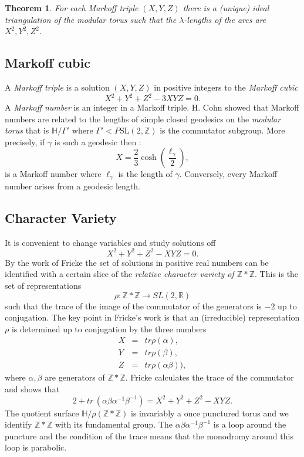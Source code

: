 \documentclass[14pt,a4paper]{amsart}
\newtheorem{thm}{Theorem}[section]
\def\HH{\mathbb{H}}
\def\ZZ{\mathbb{Z}}
\def\RR{\mathbb{R}}
\def\sl2{\mathrm{SL}(2, \ZZ)}
\begin{document}
 \begin{thm}
 For each  Markoff triple $(X,Y,Z)$
 there is a (unique) ideal triangulation of the modular torus
 such that the $\lambda$-lengths of the arcs are 
 $X^2,Y^2,Z^2$.
 \end{thm}

 \subsection{Markoff cubic}

 A \textit{Markoff triple} is a  solution $(X,Y,Z)$  in positive integers to
 the \textit{Markoff cubic}
 \begin{equation}\label{m cubic}
 X^2 + Y^2 + Z^2 - 3XYZ = 0.
 \end{equation}
 A \textit{Markoff number} is an integer in a Markoff triple.
 H. Cohn showed that Markoff numbers are related to the 
 lengths of simple closed geodesics on the \textit{modular torus}
 that is $\HH/\Gamma'$ 
 where $\Gamma' < P\sl2$ is the commutator subgroup.
 More precisely, if $\gamma$ is such a geodesic then :
 \begin{equation}
 X  = \frac{2}{3} \cosh \left( \frac{\ell_\gamma}{2}\right),
 \end{equation}
 is a Markoff number where $\ell_\gamma$ is the length of $\gamma$.
 Conversely, every Markoff number arises from a geodesic length.

 \subsection{Character Variety}

 It is convenient to change variables and study solutions off
 \begin{equation}\label{f cubic}
 X^2 + Y^2 + Z^2 - XYZ = 0.
 \end{equation}
 By the work of Fricke the set of solutions in positive real numbers
 can be identified with a certain slice of the 
 \textit{relative character variety of $\ZZ * \ZZ$}.
 This is the set of  representations 
 $$\rho: \ZZ * \ZZ \rightarrow SL(2, \RR)$$
 such that the trace of the image of the commutator of the generators is $-2$
 up to conjugation.
 The key point in Fricke's work is that an (irreducible) representation $\rho$
 is determined up to conjugation by the three numbers
 \begin{eqnarray*}
 X &= &tr \rho(\alpha), \\
 Y  &= &tr \rho(\beta), \\
 Z &= & tr \rho(\alpha\beta)),
 \end{eqnarray*}
 where $\alpha,\beta$ are generators of $\ZZ*\ZZ$.
 Fricke calculates the trace of the commutator and shows that
 \begin{equation}
 2 + tr\,  (\alpha\beta\alpha^{-1}\beta^{-1}) = X^2 + Y^2 + Z^2 - XYZ .
 \end{equation}
 The quotient surface $\HH/\rho(\ZZ*\ZZ)$ is invariably a once punctured torus
 and we identify $\ZZ * \ZZ$ with its fundamental group.
 The $\alpha\beta\alpha^{-1}\beta^{-1}$ is a loop around the puncture
 and the condition of the trace means that the monodromy around this loop is parabolic.
\end{document}
